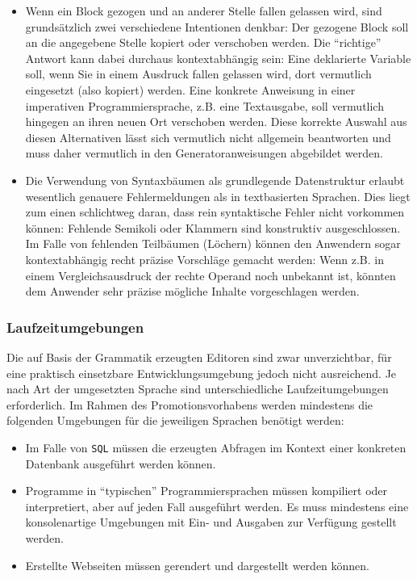 \documentclass[paper=a4,fontsize=12pt,parskip=half]{scrartcl}
\begin{document}
\begin{itemize}
\item Wenn ein Block gezogen und an anderer Stelle fallen gelassen wird, sind grundsätzlich zwei verschiedene Intentionen denkbar: Der gezogene Block soll an die angegebene Stelle kopiert oder verschoben werden. Die \enquote{richtige} Antwort kann dabei durchaus kontextabhängig sein: Eine deklarierte Variable soll, wenn Sie in einem Ausdruck fallen gelassen wird, dort vermutlich eingesetzt (also kopiert) werden. Eine konkrete Anweisung in einer imperativen Programmiersprache, z.B. eine Textausgabe, soll vermutlich hingegen an ihren neuen Ort verschoben werden. Diese korrekte Auswahl aus diesen Alternativen lässt sich vermutlich nicht allgemein beantworten und muss daher vermutlich in den Generatoranweisungen abgebildet werden.
\item Die Verwendung von Syntaxbäumen als grundlegende Datenstruktur erlaubt wesentlich genauere Fehlermeldungen als in textbasierten Sprachen. Dies liegt zum einen schlichtweg daran, dass rein syntaktische Fehler nicht vorkommen können: Fehlende Semikoli oder Klammern sind konstruktiv ausgeschlossen. Im Falle von fehlenden Teilbäumen (Löchern) können den Anwendern sogar kontextabhängig recht präzise Vorschläge gemacht werden: Wenn z.B. in einem Vergleichsausdruck der rechte Operand noch unbekannt ist, könnten dem Anwender sehr präzise mögliche Inhalte vorgeschlagen werden.
\end{itemize}

\subsubsection{Laufzeitumgebungen}

Die auf Basis der Grammatik erzeugten Editoren sind zwar unverzichtbar, für eine praktisch einsetzbare Entwicklungsumgebung jedoch nicht ausreichend. Je nach Art der umgesetzten Sprache sind unterschiedliche Laufzeitumgebungen erforderlich. Im Rahmen des Promotionsvorhabens werden mindestens die folgenden Umgebungen für die jeweiligen Sprachen benötigt werden:

\begin{itemize}
\item Im Falle von \texttt{SQL} müssen die erzeugten Abfragen im Kontext einer konkreten Datenbank ausgeführt werden können.
\item Programme in \enquote{typischen} Programmiersprachen müssen kompiliert oder interpretiert, aber auf jeden Fall ausgeführt werden. Es muss mindestens eine konsolenartige Umgebungen mit Ein- und Ausgaben zur Verfügung gestellt werden.
\item Erstellte Webseiten müssen gerendert und dargestellt werden können.
\end{itemize}
\end{document}
